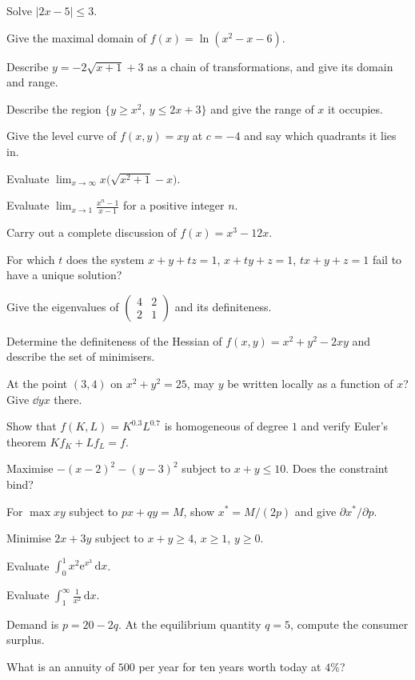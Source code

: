 \begin{problems}
  \item Solve $|2x-5|\le3$.
  \item Give the maximal domain of $f(x)=\ln(x^{2}-x-6)$.
  \item Describe $y=-2\sqrt{x+1}+3$ as a chain of transformations, and give
        its domain and range.
  \item Describe the region $\{y\ge x^{2},\ y\le 2x+3\}$ and give the range
        of $x$ it occupies.
  \item Give the level curve of $f(x,y)=xy$ at $c=-4$ and say which
        quadrants it lies in.
  \item Evaluate $\displaystyle\lim_{x\to\infty}
        x\bigl(\sqrt{x^{2}+1}-x\bigr)$.
  \item Evaluate $\displaystyle\lim_{x\to1}\frac{x^{n}-1}{x-1}$ for a
        positive integer $n$.
  \item Carry out a complete discussion of $f(x)=x^{3}-12x$.
  \item For which $t$ does the system $x+y+tz=1$, \;$x+ty+z=1$,
        \;$tx+y+z=1$ fail to have a unique solution?
  \item Give the eigenvalues of
        $\begin{pmatrix}4&2\\2&1\end{pmatrix}$ and its definiteness.
  \item Determine the definiteness of the Hessian of
        $f(x,y)=x^{2}+y^{2}-2xy$ and describe the set of minimisers.
  \item At the point $(3,4)$ on $x^{2}+y^{2}=25$, may $y$ be written
        locally as a function of $x$? Give $\dd{y}{x}$ there.
  \item Show that $f(K,L)=K^{0.3}L^{0.7}$ is homogeneous of degree $1$ and
        verify Euler's theorem $Kf_{K}+Lf_{L}=f$.
  \item Maximise $-(x-2)^{2}-(y-3)^{2}$ subject to $x+y\le10$. Does the
        constraint bind?
  \item For $\max xy$ subject to $px+qy=M$, show $x^{*}=M/(2p)$ and give
        $\partial x^{*}/\partial p$.
  \item Minimise $2x+3y$ subject to $x+y\ge4$, $x\ge1$, $y\ge0$.
  \item Evaluate $\displaystyle\int_{0}^{1}x^{2}\mathrm{e}^{x^{3}}
        \,\mathrm{d}x$.
  \item Evaluate $\displaystyle\int_{1}^{\infty}\frac{1}{x^{2}}
        \,\mathrm{d}x$.
  \item Demand is $p=20-2q$. At the equilibrium quantity $q=5$, compute the
        consumer surplus.
  \item What is an annuity of $500$ per year for ten years worth today at
        $4\%$?
\end{problems}

